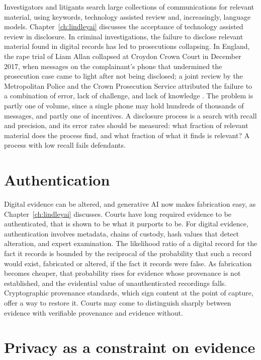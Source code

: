 Investigators and litigants search large collections of communications for relevant material, using keywords, technology assisted review and, increasingly, language models. Chapter~\ref{ch:lindleyai} discusses the acceptance of technology assisted review in disclosure. In criminal investigations, the failure to disclose relevant material found in digital records has led to prosecutions collapsing. In England, the rape trial of Liam Allan collapsed at Croydon Crown Court in December 2017, when messages on the complainant's phone that undermined the prosecution case came to light after not being disclosed; a joint review by the Metropolitan Police and the Crown Prosecution Service attributed the failure to a combination of error, lack of challenge, and lack of knowledge \citep{metcps2018}. The problem is partly one of volume, since a single phone may hold hundreds of thousands of messages, and partly one of incentives. A disclosure process is a search with recall and precision, and its error rates should be measured: what fraction of relevant material does the process find, and what fraction of what it finds is relevant? A process with low recall fails defendants.

\section{Authentication}

Digital evidence can be altered, and generative AI now makes fabrication easy, as Chapter~\ref{ch:lindleyai} discusses. Courts have long required evidence to be authenticated, that is shown to be what it purports to be. For digital evidence, authentication involves metadata, chains of custody, hash values that detect alteration, and expert examination. The likelihood ratio of a digital record for the fact it records is bounded by the reciprocal of the probability that such a record would exist, fabricated or altered, if the fact it records were false. As fabrication becomes cheaper, that probability rises for evidence whose provenance is not established, and the evidential value of unauthenticated recordings falls. Cryptographic provenance standards, which sign content at the point of capture, offer a way to restore it. Courts may come to distinguish sharply between evidence with verifiable provenance and evidence without.

\section{Privacy as a constraint on evidence}

